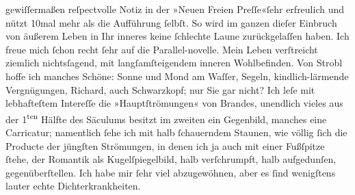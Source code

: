 \begin{ledgroupsized}[t]{13cm}
               gewiſſermaßen reſpectvolle Notiz in
                  der »Neuen Freien Preſſe«ſehr erfreulich und nützt 10mal mehr als die
               Aufführung ſelbſt. So wird im ganzen dieſer Einbruch von äußerem Leben in Ihr inneres
               keine ſchlechte Laune zurückgelaſſen haben.\pend
           \pstart
           {\pb}Ich freue mich ſchon recht ſehr
               auf die Parallel-novelle.\pend
           \pstart
           Mein Leben verſtreicht ziemlich nichtsſagend, mit \introOben{}langſam\introOben{}{ }ſteigendem inneren Wohlbefinden. Von Strobl hoffe ich manches Schöne: Sonne und Mond am
               Waſſer, Segeln, kindlich-lärmende Vergnügungen, Richard, auch Schwarzkopf; nur Sie
               gar nicht?\pend
           \pstart
           Ich leſe mit lebhafteſtem Intereſſe die »Hauptſtrömungen« von Brandes,
               unendlich vieles aus der 1\textsuperscript{ten} Hälfte des Säculums besitzt
               im zweiten ein Gegenbild, manches eine Carricatur; namentlich ſehe ich mit halb
               ſchauerndem Staunen, {\pb}wie völlig
               ſich die \introOben{}Producte der\introOben{} jüngſten Strömungen, in denen ich ja
               auch mit einer Fußſpitze ſtehe, der Romantik als Kugelſpiegelbild, halb verſchrumpft,
               halb aufgedunſen, gegenüberſtellen.\pend
           \pstart
           Ich habe mir ſehr viel abzugewöhnen, aber es ſind wenigſtens lauter echte
               Dichterkrankheiten.\pend

\end{ledgroupsized}

